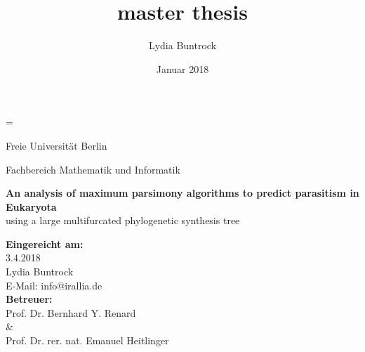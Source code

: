 
\author{Lydia Buntrock}
\title{master thesis}
\date{Januar 2018}

\hfuzz=\maxdimen {} 



  \begin{titlepage}
    \pagestyle{empty}
  	\begin{center}
      {\Large Freie Universität Berlin} \\
    	\begin{Huge}
      	Fachbereich Mathematik und Informatik \\
      	\vspace{3mm}
    	\end{Huge}
    	\vspace{2cm}
    	\begin{Large}
        \textbf{An analysis of maximum parsimony algorithms to predict parasitism in Eukaryota} \\
        \vspace{3mm}
        using a large multifurcated phylogenetic synthesis tree \\
    	\end{Large}
      \vspace{3cm}
      \textbf{Eingereicht am:} \\
      3.4.2018 \\
    	\vspace{2cm}
    	Lydia Buntrock \\
      E-Mail: info@irallia.de \\
     	\vspace{3cm}
      \textbf{Betreuer:} \\
      Prof. Dr. Bernhard Y. Renard \\
      \& \\
      Prof. Dr. rer. nat. Emanuel Heitlinger \\      
  	\end{center}
    \clearpage
  \end{titlepage}

